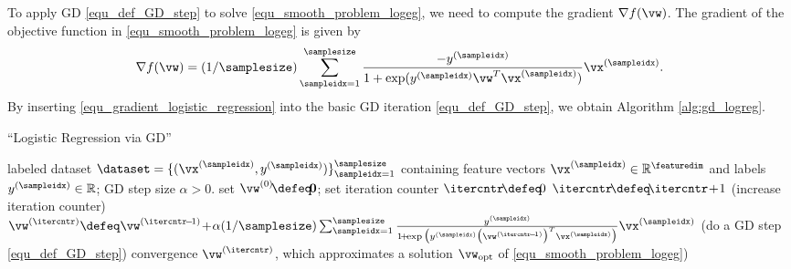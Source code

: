 \documentclass[12pt]{report}
\begin{document}
To apply GD \eqref{equ_def_GD_step} to solve \eqref{equ_smooth_problem_logeg}, 
we need to compute the gradient $\nabla f(\vw)$. 
The gradient of the objective function in \eqref{equ_smooth_problem_logeg} is given by 
\begin{equation}
\label{equ_gradient_logistic_regression}
\nabla f(\vw) = (1/\samplesize) \sum_{\sampleidx=1}^{\samplesize} \frac{-y^{(\sampleidx)}}{1 + \exp ( y^{(\sampleidx)} \vw^{T} \vx^{(\sampleidx)})} \vx^{(\sampleidx)}.
\end{equation} 
By inserting \eqref{equ_gradient_logistic_regression} into the basic GD iteration \eqref{equ_def_GD_step}, we obtain Algorithm \ref{alg:gd_logreg}. 
\begin{algorithm}[htbp]
\caption{``Logistic Regression via GD''}\label{alg:gd_logreg}
\begin{algorithmic}[1]
\renewcommand{\algorithmicrequire}{\textbf{Input:}}
\renewcommand{\algorithmicensure}{\textbf{Output:}}
\Require   labeled dataset $\dataset=\{ (\vx^{(\sampleidx)}, y^{(\sampleidx)}) \}_{\sampleidx=1}^{\samplesize}$ containing feature vectors 
$\vx^{(\sampleidx)} \in \mathbb{R}^{\featuredim}$ and labels $y^{(\sampleidx)} \in \mathbb{R}$; GD step size $\alpha >0$. 
\Statex\hspace{-6mm}{\bf Initialize:}set $\vw^{(0)}\!\defeq\!\mathbf{0}$; set iteration counter $\itercntr\!\defeq\!0$   
\Repeat 
\State $\itercntr\!\defeq\! \itercntr\!+\!1$    (increase iteration counter) 
\State  $\vw^{(\itercntr)} \defeq \vw^{(\itercntr\!-\!1)}\!+\!\alpha (1/\samplesize) \sum_{\sampleidx=1}^{\samplesize} \frac{y^{(\sampleidx)}}{1\!+\!\exp \big( y^{(\sampleidx)} \big(\vw^{(\itercntr\!-\!1)}\big)^{T} \vx^{(\sampleidx)}\big)} \vx^{(\sampleidx)}$  (do a GD step \eqref{equ_def_GD_step})
\Until convergence 
\Ensure $\vw^{(\itercntr)}$, which approximates a solution $\vw_{\rm opt}$ of \eqref{equ_smooth_problem_logeg})
\end{algorithmic}
\end{algorithm}
\end{document}
